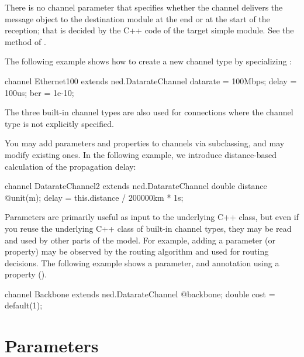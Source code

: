 \begin{note}
    There is no channel parameter that specifies whether the channel
    delivers the message object to the destination module at the end or
    at the start of the reception; that is decided by the C++ code
    of the target simple module. See the 
    method of .
\end{note}

The following example shows how to create a new channel type by
specializing :

\begin{ned}
channel Ethernet100 extends ned.DatarateChannel
{
    datarate = 100Mbps;
    delay = 100us;
    ber = 1e-10;
}
\end{ned}

\begin{note}
    The three built-in channel types are also used for connections where
    the channel type is not explicitly specified.
\end{note}

You may add parameters and properties to channels via subclassing, and
may modify existing ones. In the following example, we introduce distance-based
calculation of the propagation delay:

\begin{ned}
channel DatarateChannel2 extends ned.DatarateChannel
{
    double distance @unit(m);
    delay = this.distance / 200000km * 1s;
}
\end{ned}

Parameters are primarily useful as input to the underlying C++ class, but
even if you reuse the underlying C++ class of built-in channel types, they
may be read and used by other parts of the model. For example, adding a
 parameter (or  property) may be observed by the
routing algorithm and used for routing decisions. The following example
shows a  parameter, and annotation using a property
().

\begin{ned}
channel Backbone extends ned.DatarateChannel
{
    @backbone;
    double cost = default(1);
}
\end{ned}



\section{Parameters}
\label{sec:ch-ned-lang:parameters}

